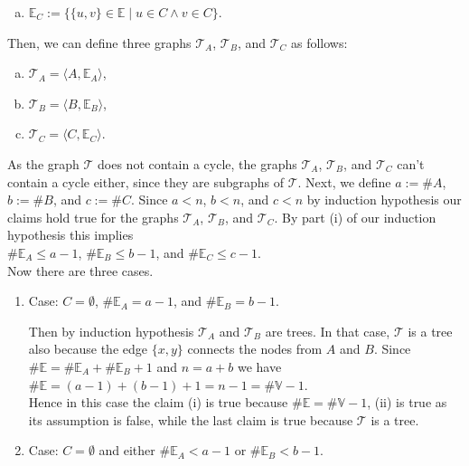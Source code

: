 \begin{enumerate}
\begin{enumerate}[(a)]
  \item $\mathbb{E}_C := \bigl\{ \{u,v\}\in\mathbb{E} \mid u\in C \wedge v\in C \bigr\}$.
  \end{enumerate}
  Then, we can define three graphs $\mathcal{T}_A$, $\mathcal{T}_B$, and $\mathcal{T}_C$ as follows:
  \begin{enumerate}[(a)]
  \item $\mathcal{T}_A = \langle A, \mathbb{E}_A \rangle$,
  \item $\mathcal{T}_B = \langle B, \mathbb{E}_B \rangle$,
  \item $\mathcal{T}_C = \langle C, \mathbb{E}_C \rangle$.
  \end{enumerate}
  As the graph $\mathcal{T}$ does not contain a cycle, the graphs $\mathcal{T}_A$, $\mathcal{T}_B$, and $\mathcal{T}_C$ can't contain a cycle either,
  since they are subgraphs of $\mathcal{T}$.  Next, we define $a := \# A$, $b := \# B$, and $c := \# C$.
  Since $a < n$, $b < n$, and $c < n$ by induction hypothesis our claims hold true for the graphs  $\mathcal{T}_A$, $\mathcal{T}_B$, and
  $\mathcal{T}_C$.  By part (i) of our induction hypothesis this implies
    \\[0.2cm]
  \hspace*{1.3cm}
  $\# \mathbb{E}_A \leq a - 1$, \quad
  $\# \mathbb{E}_B \leq b - 1$, \quad and \quad $\# \mathbb{E}_C \leq c - 1$.
  \\[0.2cm]
  Now there are three cases.
  \begin{enumerate}
  \item Case: $C = \emptyset$, $\#\mathbb{E}_A = a - 1$, and $\#\mathbb{E}_B = b - 1$.
    
    Then by induction hypothesis $\mathcal{T}_A$ and $\mathcal{T}_B$ are trees.  In that case, $\mathcal{T}$ is
    a tree also because the edge $\{x,y\}$ connects the nodes from $A$ and $B$.
    Since $\#\mathbb{E} = \#\mathbb{E}_A + \#\mathbb{E}_B + 1$ and $n = a + b$ we have
    \\[0.2cm]
    \hspace*{1.3cm}
    $\#\mathbb{E} = (a - 1) + (b - 1) + 1 = n - 1 = \#\mathbb{V} - 1$.
    \\[0.2cm]
    Hence in this case the claim (i) is true because $\# \mathbb{E} = \# \mathbb{V} - 1$, (ii)  is true as
    its assumption is false,  while the last claim is true because $\mathcal{T}$ is a tree.
    \green{$\surd$}
  \item Case: $C = \emptyset$ and either $\#\mathbb{E}_A < a - 1$ or $\#\mathbb{E}_B < b - 1$.
    

\end{enumerate}
\end{enumerate}
